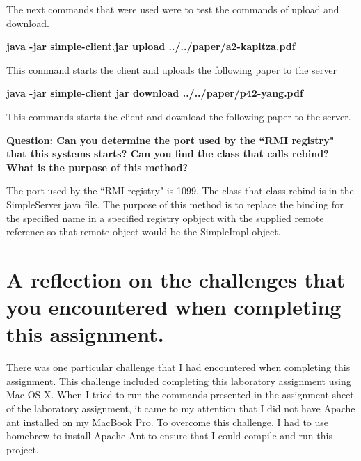 \documentclass{article}
\begin{document}
The next commands that were used were to test the commands of upload and download. 
 
\textbf{java -jar simple-client.jar upload ../../paper/a2-kapitza.pdf}

This command starts the client and uploads the following paper to the server

\textbf{java -jar simple-client jar download ../../paper/p42-yang.pdf}

This commands starts the client and download the following paper to the server. 


\textbf{Question: Can you determine the port used by the ``RMI registry" that this systems starts? Can you find the class that calls rebind? What is the purpose of this method?}

The port used by the ``RMI registry" is 1099. The class that class rebind is in the SimpleServer.java file. The purpose of this method is to replace the binding for the specified name in a specified registry opbject with the supplied remote reference so that remote object would be the SimpleImpl object.

%
%
%
\section{A reflection on the challenges that you encountered when completing this assignment.}

There was one particular challenge that I had encountered when completing this assignment. This challenge included completing this laboratory assignment using Mac OS X. When I tried to run the commands presented in the assignment sheet of the laboratory assignment, it came to my attention that I did not have Apache ant installed on my MacBook Pro. To overcome this challenge, I had to use homebrew to install Apache Ant to ensure that I could compile and run this project. 


\nocite{tanenbaum_steen_2007}
\nocite{Kapitza:2005:FRE:1101516.1101518}
\nocite{Yang:2006:SSJ:1168054.1168063}



%


\end{document}
